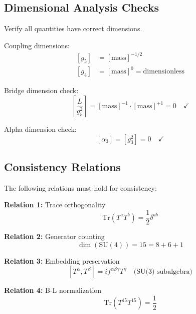 \documentclass[11pt,a4paper]{article}
\theoremstyle{definition}
\begin{document}
\subsection{Dimensional Analysis Checks}
\label{subsec:dim-analysis}

Verify all quantities have correct dimensions.

Coupling dimensions:
\begin{align}
  \label{eq:dim-g5}
  [g_5] &= [\text{mass}]^{-1/2} \\
  \label{eq:dim-g4}
  [g_4] &= [\text{mass}]^0 = \text{dimensionless}
\end{align}

Bridge dimension check:
\begin{equation}
  \label{eq:dim-bridge}
  \left[\frac{L}{g_5^2}\right] = [\text{mass}]^{-1} \cdot [\text{mass}]^{+1} = 0 \quad \checkmark
\end{equation}

Alpha dimension check:
\begin{equation}
  \label{eq:dim-alpha}
  [\alpha_3] = [g_3^2] = 0 \quad \checkmark
\end{equation}

\subsection{Consistency Relations}
\label{subsec:consistency}

The following relations must hold for consistency:

\textbf{Relation 1:} Trace orthogonality
\begin{equation}
  \label{eq:consist-1}
  \text{Tr}(T^a T^b) = \frac{1}{2}\delta^{ab}
\end{equation}

\textbf{Relation 2:} Generator counting
\begin{equation}
  \label{eq:consist-2}
  \dim(\text{SU}(4)) = 15 = 8 + 6 + 1
\end{equation}

\textbf{Relation 3:} Embedding preservation
\begin{equation}
  \label{eq:consist-3}
  [T^{\alpha}, T^{\beta}] = i f^{\alpha\beta\gamma} T^{\gamma} \quad \text{(SU(3) subalgebra)}
\end{equation}

\textbf{Relation 4:} B-L normalization
\begin{equation}
  \label{eq:consist-4}
  \text{Tr}(T^{15} T^{15}) = \frac{1}{2}
\end{equation}
\end{document}
